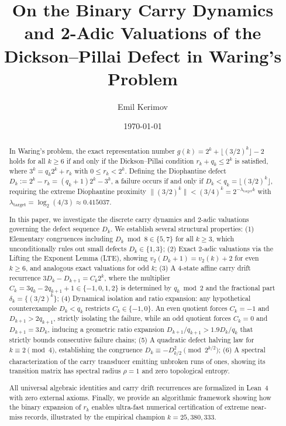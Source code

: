 \documentclass[11pt,reqno]{amsart}
\title[Carry Dynamics and 2-Adic Valuations in Dickson--Pillai]{On the Binary Carry Dynamics and 2-Adic Valuations of the Dickson--Pillai Defect in Waring's Problem}
\author{Emil Kerimov}
\date{\today}
\theoremstyle{definition}
\numberwithin{equation}{section}
\begin{document}
\begin{abstract}
In Waring's problem, the exact representation number $g(k) = 2^k + \lfloor(3/2)^k\rfloor - 2$ holds for all $k \ge 6$ if and only if the Dickson--Pillai condition $r_k + q_k \le 2^k$ is satisfied, where $3^k = q_k 2^k + r_k$ with $0 \le r_k < 2^k$. Defining the Diophantine defect $D_k := 2^k - r_k = (q_k + 1)2^k - 3^k$, a failure occurs if and only if $D_k < q_k = \lfloor(3/2)^k\rfloor$, requiring the extreme Diophantine proximity $\|(3/2)^k\| < (3/4)^k = 2^{-\lambda_{\mathrm{target}} k}$ with $\lambda_{\mathrm{target}} = \log_2(4/3) \approx 0.415037$.

In this paper, we investigate the discrete carry dynamics and 2-adic valuations governing the defect sequence $D_k$. We establish several structural properties:
(1) Elementary congruences including $D_k \bmod 8 \in \{5, 7\}$ for all $k \ge 3$, which unconditionally rules out small defects $D_k \in \{1, 3\}$;
(2) Exact 2-adic valuations via the Lifting the Exponent Lemma (LTE), showing $v_2(D_k + 1) = v_2(k) + 2$ for even $k \ge 6$, and analogous exact valuations for odd $k$;
(3) A 4-state affine carry drift recurrence $3 D_k - D_{k+1} = C_k 2^k$, where the multiplier $C_k = 3 q_k - 2 q_{k+1} + 1 \in \{-1, 0, 1, 2\}$ is determined by $q_k \bmod 2$ and the fractional part $\delta_k = \{(3/2)^k\}$;
(4) Dynamical isolation and ratio expansion: any hypothetical counterexample $D_k < q_k$ restricts $C_k \in \{-1, 0\}$. An even quotient forces $C_k = -1$ and $D_{k+1} > 2 q_{k+1}$, strictly isolating the failure, while an odd quotient forces $C_k = 0$ and $D_{k+1} = 3 D_k$, inducing a geometric ratio expansion $D_{k+1}/q_{k+1} > 1.9 D_k/q_k$ that strictly bounds consecutive failure chains;
(5) A quadratic defect halving law for $k \equiv 2 \pmod 4$, establishing the congruence $D_k \equiv -D_{k/2}^2 \pmod{2^{k/2}}$;
(6) A spectral characterization of the carry transducer emitting unbroken runs of ones, showing its transition matrix has spectral radius $\rho = 1$ and zero topological entropy.

All universal algebraic identities and carry drift recurrences are formalized in Lean~4 with zero external axioms. Finally, we provide an algorithmic framework showing how the binary expansion of $r_k$ enables ultra-fast numerical certification of extreme near-miss records, illustrated by the empirical champion $k = 25{,}380{,}333$.
\end{abstract}

\maketitle
\end{document}

